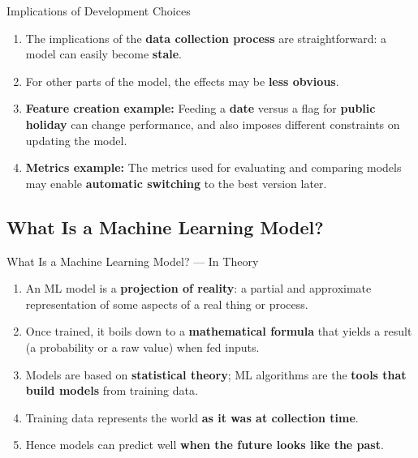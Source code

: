 \begin{frame}{Implications of Development Choices}
\begin{enumerate}
\item<1-> The implications of the \textbf{data collection process} are straightforward: a model can easily become \textbf{stale}.
\item<2-> For other parts of the model, the effects may be \textbf{less obvious}.
\item<3-> \textbf{Feature creation example:} Feeding a \textbf{date} versus a flag for \textbf{public holiday} can change performance, and also imposes different constraints on updating the model.
\item<4-> \textbf{Metrics example:} The metrics used for evaluating and comparing models may enable \textbf{automatic switching} to the best version later.
\end{enumerate}
\end{frame}

\subsection{What Is a Machine Learning Model?}

\begin{frame}{What Is a Machine Learning Model? --- In Theory}
\begin{enumerate}
\item<1-> An ML model is a \textbf{projection of reality}: a partial and approximate representation of some aspects of a real thing or process.
\item<2-> Once trained, it boils down to a \textbf{mathematical formula} that yields a result (a probability or a raw value) when fed inputs.
\item<3-> Models are based on \textbf{statistical theory}; ML algorithms are the \textbf{tools that build models} from training data.
\item<4-> Training data represents the world \textbf{as it was at collection time}.
\item<5-> Hence models can predict well \textbf{when the future looks like the past}.
\end{enumerate}
\end{frame}

